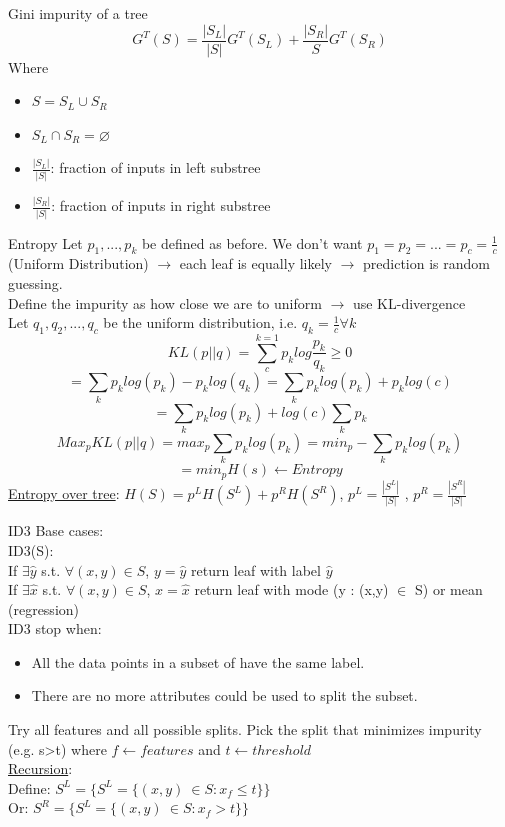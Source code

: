 \documentclass[aspectratio=1610]{beamer}
\begin{document}
\begin{frame}{Gini impurity of a tree}
$$G^T(S) = \frac{|S_L|}{|S|} G^T(S_L) + \frac{|S_R|}{S} G^T(S_R)$$
Where
\begin{itemize}
    \item $S = S_L \cup S_R$
    \item $S_L \cap S_R = \varnothing$ 
    \item $\frac{|S_L|}{|S|}$: fraction of inputs in left substree
    \item $\frac{|S_R|}{|S|}$: fraction of inputs in right substree
\end{itemize}
    
\end{frame}


\begin{frame}{Entropy}
    Let $p_1, ..., p_k$ be defined as before. We don't want $p_1 = p_2 =...= p_c = \frac{1}{c}$ (Uniform Distribution) $\to$ each leaf is equally likely $\to$ prediction is random guessing.\\
    Define the impurity as how close we are to uniform $\to$ use KL-divergence\\ Let $q_1, q_2, ..., q_c$ be the uniform distribution, i.e. $q_k = \frac{1}{c} \forall k$
    $$KL(p||q) = \sum_{c}^{k=1}p_k log\frac{p_k}{q_k} \geq 0$$
    $$ = \sum_{k}p_k log(p_k) - p_k log(q_k) = \sum_{k}p_k log(p_k) + p_k log(c)$$
    $$=\sum_{k}p_k log(p_k) + log(c) \sum_{k}p_k$$
    $$Max_{p}KL(p||q) = max_{p}\sum_{k}p_k log(p_k) = min_{p} - \sum_{k}p_k log(p_k)$$
    $$= min_{p}H(s) \leftarrow Entropy$$ 
    \underline{Entropy over tree}: $H(S) = p^LH(S^L) + p^RH(S^R)$, $p^L = \frac{|S^L|}{|S|}$ , $p^R = \frac{|S^R|}{|S|}$
\end{frame}

\begin{frame}{ID3}
    Base cases:\\
    ID3(S):\\
    If $\exists \hat{y}$ s.t. $\forall(x,y) \in S$, $y = \hat{y}$ return leaf with label $\hat{y}$\\
    If $\exists \hat{x}$ s.t. $\forall(x,y) \in S$, $x = \hat{x}$ return leaf with mode (y : (x,y) $\in$ S) or mean (regression)\\
    ID3 stop when:
    \begin{itemize}
        \item All the data points in a subset of have the same label.
        \item There are no more attributes could be used to split the subset. 
    \end{itemize}
    Try all features and all possible splits. Pick the split that minimizes impurity (e.g. s>t) where $f \leftarrow features$ and $t \leftarrow threshold$ \\
    \underline{Recursion}:\\
    Define: $S^L = \{S^L = \{(x,y)\ \in S: x_f \leq t\}\}$\\ \quad\quad Or:  
    $S^R = \{S^L = \{(x,y)\ \in S: x_f > t\}\}$
\end{frame}
\end{document}
